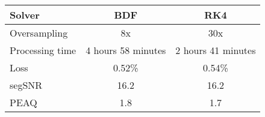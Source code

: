 \begin{tabular}{@{} l|c c @{}}
    \toprule
    Solver & \acs{BDF} & \acs{RK}4 \\ \midrule
    Oversampling & 8x & 30x \\
    Processing time & 4 hours 58 minutes & 2 hours 41 minutes \\ \midrule
    Loss   & 0.52\% & 0.54\% \\
    segSNR & 16.2 & 16.2 \\
    PEAQ    & 1.8 & 1.7 \\ \bottomrule
\end{tabular}%
